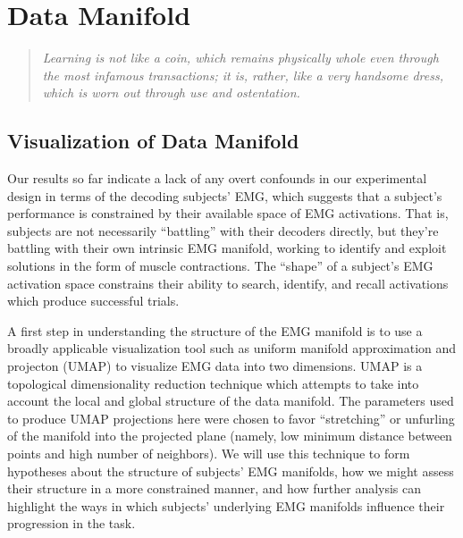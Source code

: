 \documentclass[../main.tex]{subfiles}
\begin{document}
\chapter{Data Manifold}\label{chap:data_manifold}


\begin{quote}
    \emph{Learning is not like a coin, which remains physically whole even through the most infamous transactions; it is, rather, like a very handsome dress, which is worn out through use and ostentation.}\\
  \end{quote}

\cleardoublepage%




\section{Visualization of Data Manifold}

Our results so far indicate a lack of any overt confounds in our experimental design in terms of the decoding subjects' EMG, which suggests that a subject's performance is constrained by their available space of EMG activations. That is, subjects are not necessarily ``battling'' with their decoders directly, but they're battling with their own intrinsic EMG manifold, working to identify and exploit solutions in the form of muscle contractions. The ``shape'' of a subject's EMG activation space constrains their ability to search, identify, and recall activations which produce successful trials.

A first step in understanding the structure of the EMG manifold is to use a broadly applicable visualization tool such as uniform manifold approximation and projecton (UMAP) to visualize EMG data into two dimensions\cite{mcinnesUMAPUniformManifold2018}. UMAP is a topological dimensionality reduction technique which attempts to take into account the local and global structure of the data manifold. The parameters used to produce UMAP projections here were chosen to favor ``stretching'' or unfurling of the manifold into the projected plane (namely, low minimum distance between points and high number of neighbors). We will use this technique to form hypotheses about the structure of subjects' EMG manifolds, how we might assess their structure in a more constrained manner, and how further analysis can highlight the ways in which subjects' underlying EMG manifolds influence their progression in the task. 
\end{document}
